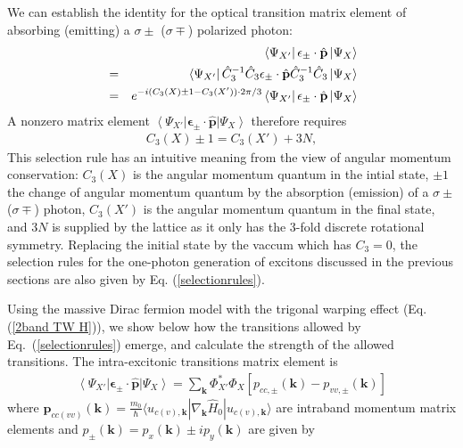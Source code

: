 \documentclass[prb,twocolumn,amsmath,amssymb,superscriptaddress,showpacs]{revtex4}
\begin{document}
We can establish the identity for the optical transition matrix element of absorbing (emitting) a $\sigma \pm$ ($\sigma \mp$) polarized photon:
\begin{eqnarray}
& &\left\langle \Psi_{X'}\right|\mathbf{\epsilon}_{\pm}\cdot\hat{\mathbf{p}}\left|\Psi_{X}\right\rangle \notag \\
&=& \left\langle \Psi_{X'}\right| \hat{C}_3^{-1} \hat{C}_3 \mathbf{\epsilon}_{\pm}\cdot\hat{\mathbf{p}} \hat{C}_3^{-1} \hat{C}_3 \left|\Psi_{X}\right\rangle \notag \\
&=& e^{-i (C_{3}(X) \pm1 -C_{3}(X')) \cdot2\pi/3}  \left\langle \Psi_{X'}\right|\mathbf{\epsilon}_{\pm}\cdot\hat{\mathbf{p}}\left|\Psi_{X}\right\rangle
\end{eqnarray}
A nonzero matrix element $\left\langle \Psi_{X'}\right|\mathbf{\epsilon}_{\pm}\cdot\hat{\mathbf{p}}\left|\Psi_{X}\right\rangle$ therefore requires
\begin{align}
C_{3}(X)  \pm 1 =C_{3}(X') + 3N, \label{selectionrules}
\end{align}
This selection rule has an intuitive meaning from the view of angular momentum conservation: $C_{3}(X)$ is the angular momentum quantum in the intial state, $ \pm 1$ the change of angular momentum quantum by the absorption (emission) of a $\sigma \pm $ ($\sigma \mp$) photon, $C_{3}(X')$ is the angular momentum quantum in the final state, and $3N$ is supplied by the lattice as it only has the 3-fold discrete rotational symmetry. Replacing the initial state by the vaccum which has $C_{3}=0$,  the selection rules for the one-photon generation of excitons discussed in the previous sections are also given by Eq. (\ref{selectionrules}).

Using the massive Dirac fermion model with the trigonal warping effect (Eq. (\ref{2band TW H})), we show below how the transitions allowed by Eq.~(\ref{selectionrules}) emerge, and calculate the strength of the allowed transitions. The intra-excitonic transitions matrix element is
\begin{align}
\left\langle \Psi_{X'}\right|\mathbf{\epsilon}_{\pm}\cdot\hat{\mathbf{p}}\left|\Psi_{X}\right\rangle =\sum_{\mathbf{k}}\Phi_{X'}^{*}\Phi_{X}[p_{cc,\pm}(\mathbf{k})-p_{vv,\pm}(\mathbf{k})] \label{intramatrixelement}
 \end{align}
where $\mathbf{p}_{cc(vv)}(\mathbf{k})=\frac{m_{0}}{\hbar}\langle u_{c(v),\mathbf k}|\nabla_{\mathbf k}\hat{H}_{0}|u_{c(v),\mathbf{k}}\rangle$ are intraband momentum matrix elements and $p_{\pm}(\mathbf{k})=p_{x}(\mathbf{k})\pm ip_{y}(\mathbf{k})$ are given by
\end{document}
